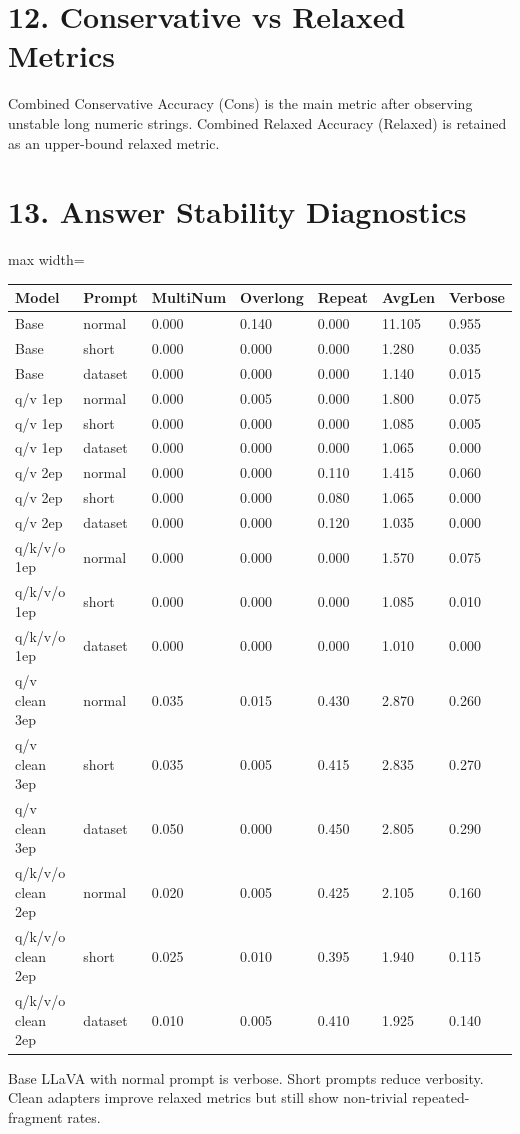 \documentclass[11pt]{article}
\begin{document}
\section*{12. Conservative vs Relaxed Metrics}
Combined Conservative Accuracy (Cons) is the main metric after observing unstable long numeric strings. Combined Relaxed Accuracy (Relaxed) is retained as an upper-bound relaxed metric.

\section*{13. Answer Stability Diagnostics}
\begin{center}\scriptsize\begin{adjustbox}{max width=\textwidth}
\begin{tabular}{lllllll}
\toprule
Model & Prompt & MultiNum & Overlong & Repeat & AvgLen & Verbose \\
\midrule
Base & normal & 0.000 & 0.140 & 0.000 & 11.105 & 0.955 \\
Base & short & 0.000 & 0.000 & 0.000 & 1.280 & 0.035 \\
Base & dataset & 0.000 & 0.000 & 0.000 & 1.140 & 0.015 \\
q/v 1ep & normal & 0.000 & 0.005 & 0.000 & 1.800 & 0.075 \\
q/v 1ep & short & 0.000 & 0.000 & 0.000 & 1.085 & 0.005 \\
q/v 1ep & dataset & 0.000 & 0.000 & 0.000 & 1.065 & 0.000 \\
q/v 2ep & normal & 0.000 & 0.000 & 0.110 & 1.415 & 0.060 \\
q/v 2ep & short & 0.000 & 0.000 & 0.080 & 1.065 & 0.000 \\
q/v 2ep & dataset & 0.000 & 0.000 & 0.120 & 1.035 & 0.000 \\
q/k/v/o 1ep & normal & 0.000 & 0.000 & 0.000 & 1.570 & 0.075 \\
q/k/v/o 1ep & short & 0.000 & 0.000 & 0.000 & 1.085 & 0.010 \\
q/k/v/o 1ep & dataset & 0.000 & 0.000 & 0.000 & 1.010 & 0.000 \\
q/v clean 3ep & normal & 0.035 & 0.015 & 0.430 & 2.870 & 0.260 \\
q/v clean 3ep & short & 0.035 & 0.005 & 0.415 & 2.835 & 0.270 \\
q/v clean 3ep & dataset & 0.050 & 0.000 & 0.450 & 2.805 & 0.290 \\
q/k/v/o clean 2ep & normal & 0.020 & 0.005 & 0.425 & 2.105 & 0.160 \\
q/k/v/o clean 2ep & short & 0.025 & 0.010 & 0.395 & 1.940 & 0.115 \\
q/k/v/o clean 2ep & dataset & 0.010 & 0.005 & 0.410 & 1.925 & 0.140 \\
\bottomrule
\end{tabular}
\end{adjustbox}\end{center}
Base LLaVA with normal prompt is verbose. Short prompts reduce verbosity. Clean adapters improve relaxed metrics but still show non-trivial repeated-fragment rates.
\end{document}

